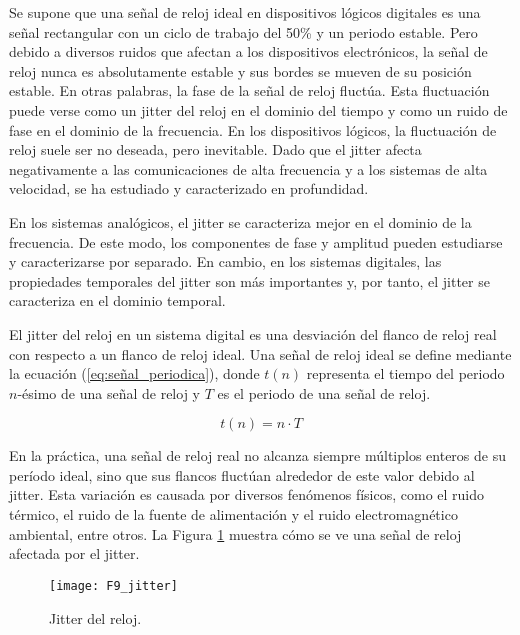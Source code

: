             Se supone que una señal de reloj ideal en dispositivos lógicos digitales es una señal rectangular con un ciclo de trabajo del 50\% y un periodo estable. Pero debido a diversos ruidos que afectan a los dispositivos electrónicos, la señal de reloj nunca es absolutamente estable y sus bordes se mueven de su posición estable. En otras palabras, la fase de la señal de reloj fluctúa. Esta fluctuación puede verse como un jitter del reloj en el dominio del tiempo y como un ruido de fase en el dominio de la frecuencia. En los dispositivos lógicos, la fluctuación de reloj suele ser no deseada, pero inevitable. Dado que el jitter afecta negativamente a las comunicaciones de alta frecuencia y a los sistemas de alta velocidad, se ha estudiado y caracterizado en profundidad.

            En los sistemas analógicos, el jitter se caracteriza mejor en el dominio de la frecuencia. De este modo, los componentes de fase y amplitud pueden estudiarse y caracterizarse por separado. En cambio, en los sistemas digitales, las propiedades temporales del jitter son más importantes y, por tanto, el jitter se caracteriza en el dominio temporal.

            El jitter del reloj en un sistema digital es una desviación del flanco de reloj real con respecto a un flanco de reloj ideal. Una señal de reloj ideal se define mediante la ecuación (\ref{eq:señal_periodica}), donde $t(n)$ representa el tiempo del periodo $n$-ésimo de una señal de reloj y $T$ es el periodo de una señal de reloj.

            \begin{equation}
                t(n) = n \cdot T 
                \label{eq:señal_periodica}
            \end{equation}

            En la práctica, una señal de reloj real no alcanza siempre múltiplos enteros de su período ideal, sino que sus flancos fluctúan alrededor de este valor debido al jitter. Esta variación es causada por diversos fenómenos físicos, como el ruido térmico, el ruido de la fuente de alimentación y el ruido electromagnético ambiental, entre otros. La Figura \ref{fig:F9_jitter} muestra cómo se ve una señal de reloj afectada por el jitter.

            \begin{figure}[hbtp]
                \caption{Jitter del reloj.}
                \centering
                \texttt{[image: F9\_jitter]}
                \label{fig:F9_jitter}
            \end{figure}
                
